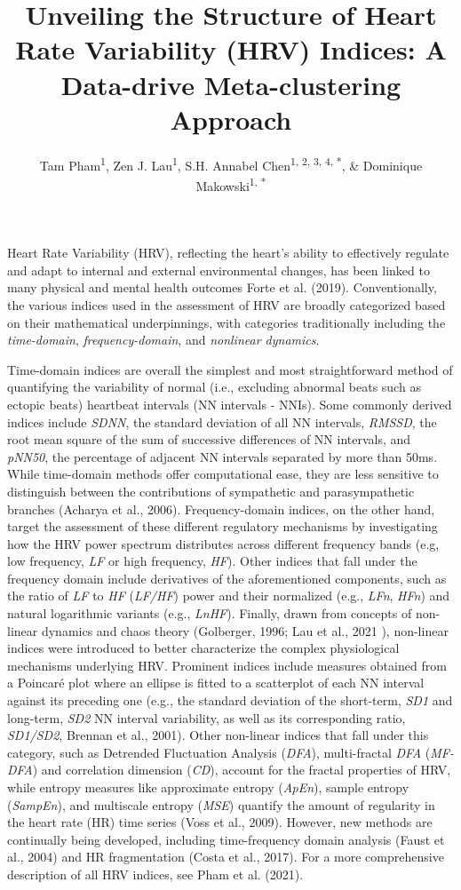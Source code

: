 \documentclass[
  english,
  jou,floatsintext]{apa6}
\title{\textbf{Unveiling the Structure of Heart Rate Variability (HRV) Indices: A Data-drive Meta-clustering Approach}}
\author{Tam Pham\textsuperscript{1}, Zen J. Lau\textsuperscript{1}, S.H. Annabel Chen\textsuperscript{1, 2, 3, 4, *}, \& Dominique Makowski\textsuperscript{1, *}}
\date{}
\affiliation{\vspace{0.5cm}\textsuperscript{1} School of Social Sciences, Nanyang Technological University, Singapore\\\textsuperscript{2} Centre for Research and Development in Learning, Nanyang Technological University, Singapore\\\textsuperscript{3} Lee Kong Chian School of Medicine, Nanyang Technological University, Singapore\\\textsuperscript{4} National Institute of Education, Nanyang Technological University, Singapore}
\begin{document}
\maketitle

\justify

Heart Rate Variability (HRV), reflecting the heart's ability to effectively regulate and adapt to internal and external environmental changes, has been linked to many physical and mental health outcomes Forte et al. (2019). Conventionally, the various indices used in the assessment of HRV are broadly categorized based on their mathematical underpinnings, with categories traditionally including the \emph{time-domain}, \emph{frequency-domain}, and \emph{nonlinear dynamics}.

Time-domain indices are overall the simplest and most straightforward method of quantifying the variability of normal (i.e., excluding abnormal beats such as ectopic beats) heartbeat intervals (NN intervals - NNIs). Some commonly derived indices include \emph{SDNN}, the standard deviation of all NN intervals, \emph{RMSSD}, the root mean square of the sum of successive differences of NN intervals, and \emph{pNN50}, the percentage of adjacent NN intervals separated by more than 50ms. While time-domain methods offer computational ease, they are less sensitive to distinguish between the contributions of sympathetic and parasympathetic branches (Acharya et al., 2006). Frequency-domain indices, on the other hand, target the assessment of these different regulatory mechanisms by investigating how the HRV power spectrum distributes across different frequency bands (e.g, low frequency, \emph{LF} or high frequency, \emph{HF}). Other indices that fall under the frequency domain include derivatives of the aforementioned components, such as the ratio of \emph{LF} to \emph{HF} (\emph{LF/HF}) power and their normalized (e.g., \emph{LFn}, \emph{HFn}) and natural logarithmic variants (e.g., \emph{LnHF}). Finally, drawn from concepts of non-linear dynamics and chaos theory (Golberger, 1996; Lau et al., 2021 ), non-linear indices were introduced to better characterize the complex physiological mechanisms underlying HRV. Prominent indices include measures obtained from a Poincaré plot where an ellipse is fitted to a scatterplot of each NN interval against its preceding one (e.g., the standard deviation of the short-term, \emph{SD1} and long-term, \emph{SD2} NN interval variability, as well as its corresponding ratio, \emph{SD1/SD2}, Brennan et al., 2001). Other non-linear indices that fall under this category, such as Detrended Fluctuation Analysis (\emph{DFA}), multi-fractal \emph{DFA} (\emph{MF-DFA}) and correlation dimension (\emph{CD}), account for the fractal properties of HRV, while entropy measures like approximate entropy (\emph{ApEn}), sample entropy (\emph{SampEn}), and multiscale entropy (\emph{MSE}) quantify the amount of regularity in the heart rate (HR) time series (Voss et al., 2009). However, new methods are continually being developed, including time-frequency domain analysis (Faust et al., 2004) and HR fragmentation (Costa et al., 2017). For a more comprehensive description of all HRV indices, see Pham et al. (2021).
\end{document}
